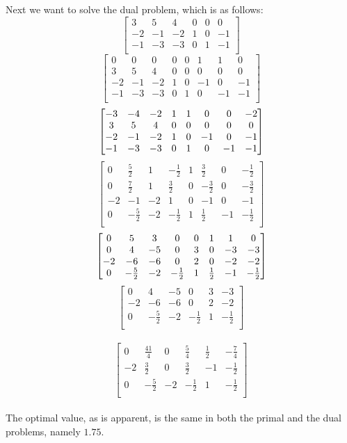 \documentclass[letterpaper,12pt]{article}
\theoremstyle{definition}
\begin{document}
Next we want to solve the dual problem, which is as follows:\\
\[
\begin{bmatrix}
3 & 5& 4& 0& 0& 0 \\
-2&-1&-2& 1& 0& -1 \\
-1&-3&-3& 0& 1& -1 \\
\end{bmatrix}
\]
\[
\begin{bmatrix}
0&0&0&0&0&1&1&0 \\
3&5&4&0&0&0&0&0 \\
-2&-1&-2& 1& 0& -1&0&-1 \\
-1&-3&-3& 0& 1& 0 &-1&-1 \\
\end{bmatrix}
\]\[
\\
\begin{bmatrix}
-3&-4&-2&1&1&0&0&-2\\
3&5&4&0&0&0&0&0 \\
-2&-1&-2& 1& 0& -1&0&-1 \\
-1&-3&-3& 0& 1& 0 &-1&-1 \\
\end{bmatrix}
\]
\[
\begin{bmatrix}
0&\frac{5}{2}&1&- \frac{1}{2}&1& \frac{3}{2} &0& - \frac{1}{2} \\
0&\frac{7}{2}&1&\frac{3}{2}&0&-\frac{3}{2}&0&-\frac{3}{2} \\
-2&-1&-2& 1& 0& -1&0&-1 \\
0&-\frac{5}{2}&-2&-\frac{1}{2}&1&\frac{1}{2}&-1&-\frac{1}{2} \\
\end{bmatrix}
\]
\[
\\
\begin{bmatrix}
0&5&3&0&0&1&1&0\\
0&4&-5&0&3&0&-3&-3 \\
-2&-6&-6&0&2&0&-2&-2 \\
0&-\frac{5}{2}&-2&-\frac{1}{2}&1&\frac{1}{2}&-1&-\frac{1}{2} \\
\end{bmatrix}
\]
\[
\begin{bmatrix}
0&4&-5&0&3&-3 \\
-2&-6&-6&0&2&-2 \\
0&-\frac{5}{2}&-2&-\frac{1}{2}&1&-\frac{1}{2} \\
\end{bmatrix}
\]
\\
\[
\begin{bmatrix}
0&\frac{41}{4}&0&\frac{5}{4}&\frac{1}{2}&-\frac{7}{4} \\
-2&\frac{3}{2}&0&\frac{3}{2}&-1&-\frac{1}{2} \\
0&-\frac{5}{2}&-2&-\frac{1}{2}&1&-\frac{1}{2} \\
\end{bmatrix}
\]
\\
The optimal value, as is apparent, is the same in both the primal and the dual problems, namely $1.75$.
\end{document}

